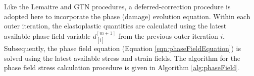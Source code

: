 \documentclass[sn-mathphys,Numbered]{sn-jnl}%
\begin{document}

Like the Lemaitre and GTN procedures, a deferred-correction procedure is adopted here to incorporate the phase (damage) evolution equation.
Within each outer iteration, the elastoplastic quantities are calculated using the latest available phase field variable $d^{[m+1]}_{[i]}$ from the previous outer iteration $i$.
Subsequently, the phase field equation (Equation \ref{eqn:phaseFieldEquation}) is solved using the latest available stress and strain fields.
The algorithm for the phase field stress calculation procedure is given in Algorithm \ref{alg:phaseField}.
\end{document}
